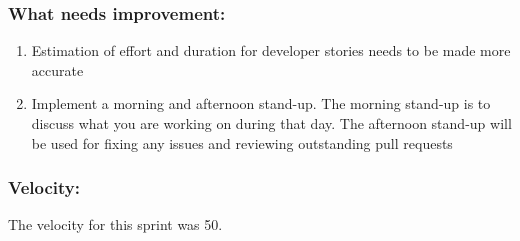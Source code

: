 \documentclass[10pt,onecolumn]{witseiepaper}
\begin{document}
\subsubsection*{What needs improvement:}
\begin{enumerate}
	\item Estimation of effort and duration for developer stories needs to be made more accurate
	\item Implement a morning and afternoon stand-up. The morning stand-up is to discuss what you are working on during that day. The afternoon stand-up will be used for fixing any issues and reviewing outstanding pull requests 
\end{enumerate}

\subsubsection*{Velocity:}
The velocity for this sprint was 50. 
\end{document}
